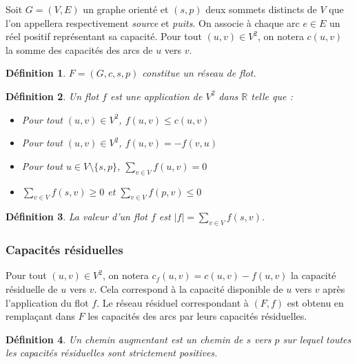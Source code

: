 \documentclass[11pt,a4paper]{article}
\newtheorem*{definition}{Définition}
\begin{document}
Soit \(G=(V,E)\) un graphe orienté et \((s,p)\) deux sommets distincts de \(V\) que l'on appellera respectivement \textit{source} et \textit{puits}. On associe à chaque arc \(e \in E\) un réel positif représentant sa capacité. Pour tout \((u,v) \in V^2\), on notera \(c(u,v)\) la somme des capacités des arcs de \(u\) vers \(v\).

\begin{definition}
  \(F = (G,c,s,p)\) constitue un réseau de flot.
\end{definition}

\begin{definition}
  Un flot \(f\) est une application de \(V^2\) dans \(\mathbb{R}\) telle que :
  \begin{itemize}
    \item Pour tout \((u,v) \in V^2\), \(f(u,v) \leq c(u,v)\)
    \item Pour tout \((u,v) \in V^2\), \(f(u,v) = -f(v,u)\)
    \item Pour tout \(u \in V \setminus \{s,p\}\), \(\sum\limits_{v \in V} f(u,v) = 0\)
    \item \(\sum\limits_{v \in V} f(s,v) \geq 0\) et \(\sum\limits_{v \in V} f(p,v) \leq 0\)
  \end{itemize}
\end{definition}

\begin{definition}
  La valeur d'un flot \(f\) est \(|f| = \sum\limits_{v \in V} f(s,v)\).
\end{definition}


    \subsubsection{Capacités résiduelles}

Pour tout \((u,v) \in V^2\), on notera \(c_f(u,v) = c(u,v) - f(u,v)\) la capacité résiduelle de \(u\) vers \(v\). Cela correspond à la capacité disponible de \(u\) vers \(v\) après l'application du flot \(f\). Le réseau résiduel correspondant à \((F,f)\) est obtenu en remplaçant dans \(F\) les capacités des arcs par leurs capacités résiduelles.

\begin{definition}
  Un chemin augmentant est un chemin de \(s\) vers \(p\) sur lequel toutes les capacités résiduelles sont strictement positives.
\end{definition}
\end{document}
